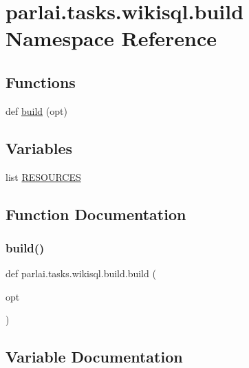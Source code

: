\hypertarget{namespaceparlai_1_1tasks_1_1wikisql_1_1build}{}\section{parlai.\+tasks.\+wikisql.\+build Namespace Reference}
\label{namespaceparlai_1_1tasks_1_1wikisql_1_1build}
\subsection*{Functions}
\begin{DoxyCompactItemize}
\item 
def \hyperlink{namespaceparlai_1_1tasks_1_1wikisql_1_1build_a8b1665667190720ed464d8a0fcf056ba}{build} (opt)
\end{DoxyCompactItemize}
\subsection*{Variables}
\begin{DoxyCompactItemize}
\item 
list \hyperlink{namespaceparlai_1_1tasks_1_1wikisql_1_1build_aa9fe14c4102b0ae815457b8650db8036}{R\+E\+S\+O\+U\+R\+C\+ES}
\end{DoxyCompactItemize}


\subsection{Function Documentation}
\mbox{\label{namespaceparlai_1_1tasks_1_1wikisql_1_1build_a8b1665667190720ed464d8a0fcf056ba}} 
\subsubsection{\texorpdfstring{build()}{build()}}
{\footnotesize\ttfamily def parlai.\+tasks.\+wikisql.\+build.\+build (\begin{DoxyParamCaption}\item[{}]{opt }\end{DoxyParamCaption})}



\subsection{Variable Documentation}
\mbox{\label{namespaceparlai_1_1tasks_1_1wikisql_1_1build_aa9fe14c4102b0ae815457b8650db8036}} 
